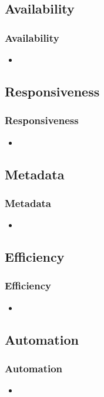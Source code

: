 \subsection{Availability}
\begin{frame}
    \frametitle{Availability}
    \vspace{3mm}
    \begin{itemize}
        \item
    \end{itemize}
\end{frame}

\subsection{Responsiveness}
\begin{frame}
    \frametitle{Responsiveness}
    \vspace{3mm}
    \begin{itemize}
        \item
    \end{itemize}
\end{frame}

\subsection{Metadata}
\begin{frame}
    \frametitle{Metadata}
    \vspace{3mm}
    \begin{itemize}
        \item
    \end{itemize}
\end{frame}

\subsection{Efficiency}
\begin{frame}
    \frametitle{Efficiency}
    \vspace{3mm}
    \begin{itemize}
        \item
    \end{itemize}
\end{frame}

\subsection{Automation}
\begin{frame}
    \frametitle{Automation}
    \vspace{3mm}
    \begin{itemize}
        \item
    \end{itemize}
\end{frame}


